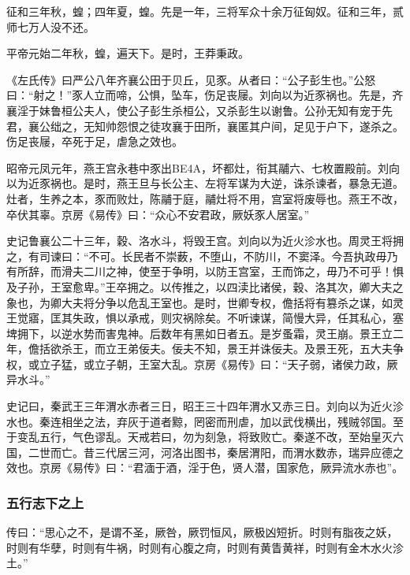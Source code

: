 \documentclass[]{article}
\begin{document}
征和三年秋，蝗；四年夏，蝗。先是一年，三将军众十余万征匈奴。征和三年，贰师七万人没不还。

平帝元始二年秋，蝗，遍天下。是时，王莽秉政。

《左氏传》曰严公八年齐襄公田于贝丘，见豕。从者曰：``公子彭生也。''公怒曰：``射之！''豕人立而啼，公惧，坠车，伤足丧屦。刘向以为近豕祸也。先是，齐襄淫于妹鲁桓公夫人，使公子彭生杀桓公，又杀彭生以谢鲁。公孙无知有宠于先君，襄公绌之，无知帅怨恨之徒攻襄于田所，襄匿其户间，足见于户下，遂杀之。伤足丧屦，卒死于足，虐急之效也。

昭帝元凤元年，燕王宫永巷中豕出BE4A，坏都灶，衔其鬴六、七枚置殿前。刘向以为近豕祸也。是时，燕王旦与长公主、左将军谋为大逆，诛杀谏者，暴急无道。灶者，生养之本，豕而败灶，陈鬴于庭，鬴灶将不用，宫室将废辱也。燕王不改，卒伏其辜。京房《易传》曰：``众心不安君政，厥妖豕人居室。''

史记鲁襄公二十三年，穀、洛水斗，将毁王宫。刘向以为近火沴水也。周灵王将拥之，有司谏曰：``不可。长民者不崇薮，不堕山，不防川，不窦泽。今吾执政毋乃有所辞，而滑夫二川之神，使至于争明，以防王宫室，王而饰之，毋乃不可乎！惧及子孙，王室愈卑。''王卒拥之。以传推之，以四渎比诸侯，穀、洛其次，卿大夫之象也，为卿大夫将分争以危乱王室也。是时，世卿专权，儋括将有篡杀之谋，如灵王觉寤，匡其失政，惧以承戒，则灾祸除矣。不听谏谋，简慢大异，任其私心，塞埤拥下，以逆水势而害鬼神。后数年有黑如日者五。是岁蚤霜，灵王崩。景王立二年，儋括欲杀王，而立王弟佞夫。佞夫不知，景王并诛佞夫。及景王死，五大夫争权，或立子猛，或立子朝，王室大乱。京房《易传》曰：``天子弱，诸侯力政，厥异水斗。''

史记曰，秦武王三年渭水赤者三日，昭王三十四年渭水又赤三日。刘向以为近火沴水也。秦连相坐之法，弃灰于道者黥，罔密而刑虐，加以武伐横出，残贼邻国。至于变乱五行，气色谬乱。天戒若曰，勿为刻急，将致败亡。秦遂不改，至始皇灭六国，二世而亡。昔三代居三河，河洛出图书，秦居渭阳，而渭水数赤，瑞异应德之效也。京房《易传》曰：``君湎于酒，淫于色，贤人潜，国家危，厥异流水赤也''。

\hypertarget{header-n2324}{%
\subsubsection{五行志下之上}\label{header-n2324}}

传曰：``思心之不，是谓不圣，厥咎，厥罚恒风，厥极凶短折。时则有脂夜之妖，时则有华孽，时则有牛祸，时则有心腹之疴，时则有黄眚黄祥，时则有金木水火沴土。''
\end{document}

